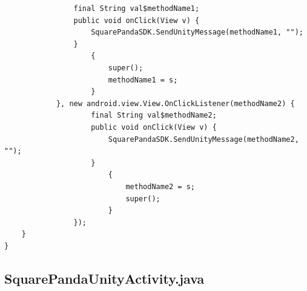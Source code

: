 \documentclass[9pt, b5paper]{article}
\begin{document}
\begin{verbatim}
                final String val$methodName1;
                public void onClick(View v) {
                    SquarePandaSDK.SendUnityMessage(methodName1, "");
                }
                    {
                        super();
                        methodName1 = s;
                    }
            }, new android.view.View.OnClickListener(methodName2) {
                    final String val$methodName2;
                    public void onClick(View v) {
                        SquarePandaSDK.SendUnityMessage(methodName2, "");
                    }
                        {
                            methodName2 = s;
                            super();
                        }
                });
    }
}
\end{verbatim}
\subsection{SquarePandaUnityActivity.java}
\label{sec-5-4}
\end{document}
